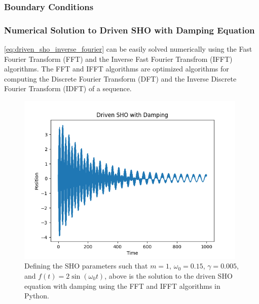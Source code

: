 \subsubsection{Boundary Conditions} %

\subsubsection{Numerical Solution to Driven SHO with Damping Equation}
\cref{eq:driven_sho_inverse_fourier} can be easily solved numerically using the Fast Fourier Transform (FFT) and the Inverse Fast Fourier Transfrom (IFFT) algorithms. The FFT and IFFT algorithms are optimized algorithms for computing the Discrete Fourier Transform (DFT) and the Inverse Discrete Fourier Transform (IDFT) of a sequence.

\begin{figure}[H]
    \centering
    \includegraphics[width=110mm,height=\textheight,keepaspectratio]{images/driven_sho_equation_numerical.png}
    \caption{Defining the SHO parameters such that \(m=1\), \(\omega_0=0.15\), \(\gamma=0.005\), and \(f(t)=2 \sin (\omega_0 t)\), above is the solution to the driven SHO equation with damping using the FFT and IFFT algorithms in Python.}
    \label{fig:driven_sho_equation_numerical}
\end{figure}


